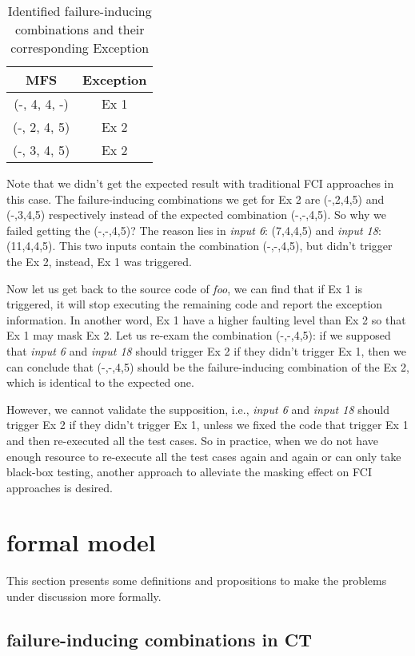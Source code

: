 \documentclass{sig-alternate}
\begin{document}
\begin{table}
\centering
\caption{Identified failure-inducing combinations and their corresponding Exception}
\label{identify-example}
\begin{tabular}{|c|c|} \hline
MFS & Exception\\ \hline
(-, 4, 4, -) &  Ex 1\\ \hline
(-, 2, 4, 5) &  Ex 2\\ \hline
(-, 3, 4, 5) &  Ex 2\\ \hline
\hline\end{tabular}
\end{table}

Note that we didn't get the expected result with traditional FCI approaches in this case. The failure-inducing combinations we get for Ex 2 are (-,2,4,5) and (-,3,4,5) respectively instead of the expected combination (-,-,4,5). So why we failed getting the (-,-,4,5)? The reason lies in \emph{input 6}: (7,4,4,5) and \emph{input 18}: (11,4,4,5). This two inputs contain the combination (-,-,4,5), but didn't trigger the Ex 2, instead,  Ex 1 was triggered.

Now let us get back to the source code of \emph{foo}, we can find that if Ex 1 is triggered, it will stop executing the remaining code and report the exception information. In another word, Ex 1 have a higher faulting level than Ex 2 so that Ex 1 may mask Ex 2. Let us re-exam the combination (-,-,4,5): if we supposed that \emph{input 6} and \emph{input 18} should trigger Ex 2 if they didn't trigger Ex 1, then we can conclude that (-,-,4,5) should be the failure-inducing combination of the Ex 2, which is identical to the expected one.

However, we cannot validate the supposition, i.e., \emph{input 6} and \emph{input 18} should trigger Ex 2 if they didn't trigger Ex 1, unless we fixed the code that trigger Ex 1 and then re-executed all the test cases. So in practice, when we do not have enough resource to re-execute all the test cases again and again or can only take black-box testing, another approach to alleviate the masking effect on FCI approaches is desired.

\section{formal model}
This section presents some definitions and propositions to make the problems under discussion more formally.

\subsection{failure-inducing combinations in CT}
\end{document}
